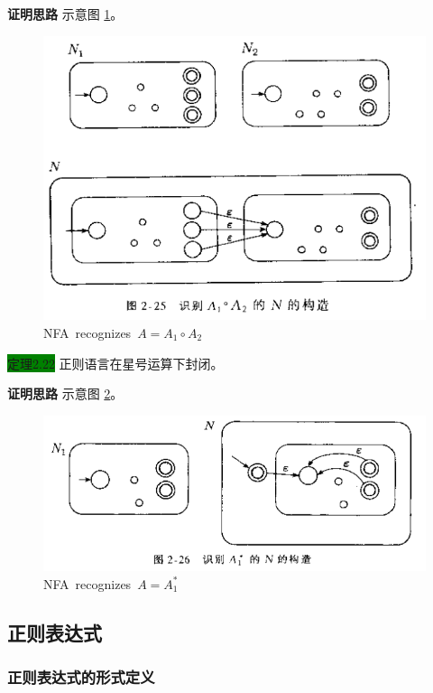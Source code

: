 \documentclass[a4paper]{article}
\begin{document}
	\textbf{证明思路} \quad 示意图 \ref{F020203-2}。
	\begin{figure}[htb]
		\centering
		\includegraphics[scale=0.8]{./figure/2.2.3-2.png}
		\caption{NFA~recognizes~$A=A_1 \circ A_2$}
		\label{F020203-2}
	\end{figure}

	\colorbox{green}{定理2.22}  正则语言在星号运算下封闭。
	
	\textbf{证明思路} \quad 示意图 \ref{F020203-3}。

	\begin{figure}[htb]
		\centering
		\includegraphics[scale=0.8]{./figure/2.2.3-3.png}
		\caption{NFA~recognizes~$A=A_1^*$}
		\label{F020203-3}
	\end{figure}

\subsection{正则表达式}

\subsubsection{正则表达式的形式定义}
\end{document}
